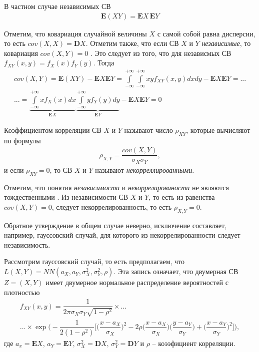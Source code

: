 \documentclass[%
	11pt,
	a4paper,
	utf8,
		]{article}
\begin{document}
В частном случае независимых СВ
\begin{align*}
	\mathbf{E}(XY) = \mathbf{E}X \, \mathbf{E}Y
\end{align*}

Отметим, что ковариация случайной величины $ X $ с самой собой равна дисперсии, то есть $ cov(X, X) = \mathbf{D}X $. Отметим также, что если СВ $ X $ и $ Y $ \emph{независимые}, то ковариация $ cov(X, Y) = 0 $ \cite[]{shulenin:param}. Это следует из того, что для независмых СВ $ f_{XY}(x, y) = f_X(x) f_Y(y) $. Тогда
\begin{multline*}
	 cov(X, Y) = \mathbf{E}(XY) - \mathbf{E}X \mathbf{E}Y = \int\limits_{-\infty}^{+\infty} \int\limits_{-\infty}^{+\infty} xy f_{XY}(x, y) dx dy - \mathbf{E}X \mathbf{E}Y =...\\ ...=\underbrace{\int\limits_{-\infty}^{+\infty} x f_{X}(x) dx}_{\mathbf{E}X} \underbrace{\int\limits_{-\infty}^{+\infty} y f_{Y}(y) dy}_{\mathbf{E}Y} - \mathbf{E}X \mathbf{E}Y = 0
\end{multline*}

Коэффициентом корреляции СВ $ X $ и $ Y $ называют число $ \rho_{XY} $, которые вычисляют по формулы
\begin{align*}
	\rho_{X, Y} = \dfrac{ cov(X, Y) }{ \sigma_X \sigma_Y },
\end{align*}
и если $ \rho_{XY} = 0 $, то СВ $ X $ и $ Y $ называют \emph{некорреллированными}.

Отметим, что понятия \emph{независимости} и \emph{некоррелированости} не являются тождественными \cite[]{shulenin:param}. Из независимости СВ $ X $ и $ Y $, то есть из равенства $ cov(X, Y) = 0 $, следует некоррелированность, то есть $ \rho_{X, Y} = 0$.

Обратное утверждение в общем случае неверно, исключение составляет, например, гауссовский случай, для которого из некоррелированности следует независимость.

Рассмотрим гауссовский случай, то есть предполагаем, что $ L(X, Y) = NN(a_X, a_Y, \sigma_X^2, \sigma_Y^2, \rho) $. Эта запись означает, что двумерная СВ $ Z = (X, Y) $ имеет двумерное нормальное распределение вероятностей с плотностью \cite[]{shulenin:param}
\begin{multline*}
	f_{XY}(x, y) = \dfrac{1}{ 2 \pi \sigma_X\sigma_Y \sqrt{1 - \rho^2}} \times \ldots\\
	\ldots \times \exp \Bigg( - \dfrac{1}{ 2(1 - \rho^2) }  \bigg[ \bigg( \dfrac{x - a_X}{\sigma_X} \bigg)^2 - 2 \rho \bigg( \dfrac{x - a_X}{\sigma_X} \bigg) \bigg( \dfrac{y - a_Y}{\sigma_Y} \bigg) + \bigg( \dfrac{x - a_Y}{\sigma_Y} \bigg)^2 \bigg] \Bigg),
\end{multline*}
где $ a_x = \mathbf{E}X $, $ a_Y = \mathbf{E}Y $, $ \sigma_X^2 = \mathbf{D}X $, $ \sigma_Y^2 = \mathbf{D}Y $ и $ \rho $ -- коээфициент корреляции.
\end{document}
